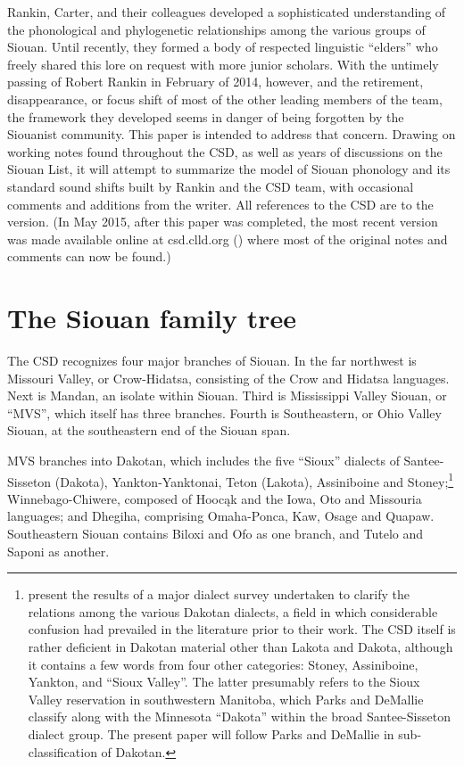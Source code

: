 \documentclass[output=paper]{LSP/langsci}
\begin{document}
Rankin, Carter, and their colleagues developed a sophisticated understanding of the phonological and phylogenetic relationships among the various groups of Siouan.  Until recently, they formed a body of respected linguistic ``elders'' who freely shared this lore on request with more junior scholars.  With the untimely passing of Robert Rankin in February of 2014, however, and the retirement, disappearance, or focus shift of most of the other leading members of the team, the framework they developed seems in danger of being forgotten by the Siouanist community.  This paper is intended to address that concern.  Drawing on working notes found throughout the CSD, as well as years of discussions on the Siouan List, it will attempt to summarize the model of Siouan phonology and its standard sound shifts built by Rankin and the CSD team, with occasional comments and additions from the writer.  All references to the CSD are to the \citeyear{Rankinetal2006PDF} version. (In May 2015, after this paper was completed, the most recent version was made available online at csd.clld.org (\citealt{Rankinetal2015AccessMay}) where most of the original notes and comments can now be found.)


\section{The Siouan family tree}

The CSD recognizes four major branches of Siouan. In the far northwest is Missouri Valley, or Crow-Hidatsa, consisting of the Crow and Hidatsa languages. Next is Mandan, an isolate within Siouan. Third is Mississippi Valley Siouan, or ``MVS'', which itself has three branches. Fourth is Southeastern, or Ohio Valley Siouan, at the southeastern end of the Siouan span.

MVS branches into Dakotan, which includes the five ``Sioux'' dialects of Santee-Sisseton (Dakota), Yankton-Yanktonai, Teton (Lakota), Assiniboine and Stoney;\footnote{\citet{ParksDeMallie1992} present the results of a major dialect survey undertaken to clarify the relations among the various Dakotan dialects, a field in which considerable confusion had prevailed in the literature prior to their work.  The CSD itself is rather deficient in Dakotan material other than Lakota and Dakota, although it contains a few words from four other categories: Stoney, Assiniboine, Yankton, and ``Sioux Valley''.  The latter presumably refers to the Sioux Valley reservation in southwestern Manitoba, which Parks and DeMallie classify along with the Minnesota ``Dakota'' within the broad Santee-Sisseton dialect group.  The present paper will follow Parks and DeMallie in sub-classification of Dakotan.}  Winnebago-Chiwere, composed of Hooc\k{a}k and the Iowa, Oto and Missouria languages; and Dhegiha, comprising Omaha-Ponca, Kaw, Osage and Quapaw.  Southeastern Siouan contains Biloxi and Ofo as one branch, and Tutelo and Saponi as another.
\end{document}

